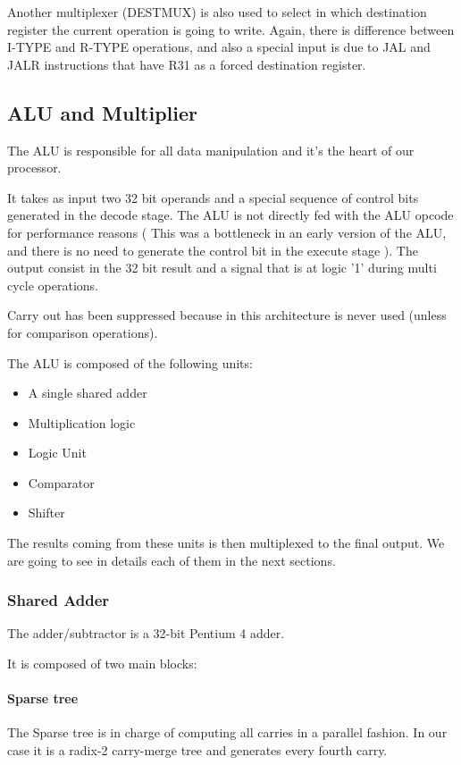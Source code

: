\documentclass[12pt]{article}
\begin{document}
Another multiplexer (DESTMUX) is also used to select in which destination register the current operation is going to write. Again, there is difference between I-TYPE and R-TYPE operations, and also a special input is due to JAL and JALR instructions that have R31 as a forced destination register.

 
\subsection{ALU and Multiplier}
The ALU is responsible for all data manipulation and it's the heart of our processor.

It takes as input two 32 bit operands and a special sequence of control bits generated in the decode stage. The ALU is not directly fed with the ALU opcode for performance reasons ( This was a bottleneck in an early version of the ALU, and there is no need to generate the control bit in the execute stage ).
The output consist in the 32 bit result and a signal that is at logic '1' during multi cycle operations.

Carry out has been suppressed because in this architecture is never used (unless for comparison operations).

The ALU is composed of the following units:

\begin{itemize}
	\item A single shared adder
	\item Multiplication logic
	\item Logic Unit
	\item Comparator
	\item Shifter
\end{itemize}

The results coming from these units is then multiplexed to the final output.
We are going to see in details each of them in the next sections.

\subsubsection{Shared Adder}
The adder/subtractor is a 32-bit Pentium 4 adder.

It is composed of two main blocks: 
\paragraph{Sparse tree}The Sparse tree is in charge of computing all carries in a parallel fashion. In our case it is a radix-2 carry-merge tree and generates every fourth carry. 
\end{document}
